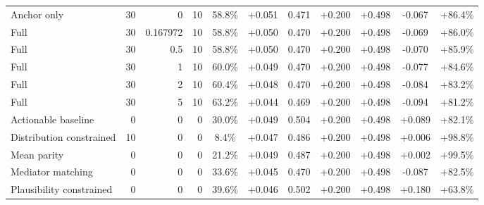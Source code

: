 \begin{table}[htbp]
\begin{tabular}{lrrrccccccc}
Anchor only & 30 & 0 & 10 & 58.8\% & +0.051 & 0.471 & +0.200 & +0.498 & -0.067 & +86.4\% \\
Full & 30 & 0.167972 & 10 & 58.8\% & +0.050 & 0.470 & +0.200 & +0.498 & -0.069 & +86.0\% \\
Full & 30 & 0.5 & 10 & 58.8\% & +0.050 & 0.470 & +0.200 & +0.498 & -0.070 & +85.9\% \\
Full & 30 & 1 & 10 & 60.0\% & +0.049 & 0.470 & +0.200 & +0.498 & -0.077 & +84.6\% \\
Full & 30 & 2 & 10 & 60.4\% & +0.048 & 0.470 & +0.200 & +0.498 & -0.084 & +83.2\% \\
Full & 30 & 5 & 10 & 63.2\% & +0.044 & 0.469 & +0.200 & +0.498 & -0.094 & +81.2\% \\
Actionable baseline & 0 & 0 & 0 & 30.0\% & +0.049 & 0.504 & +0.200 & +0.498 & +0.089 & +82.1\% \\
Distribution constrained & 10 & 0 & 0 & 8.4\% & +0.047 & 0.486 & +0.200 & +0.498 & +0.006 & +98.8\% \\
Mean parity & 0 & 0 & 0 & 21.2\% & +0.049 & 0.487 & +0.200 & +0.498 & +0.002 & +99.5\% \\
Mediator matching & 0 & 0 & 0 & 33.6\% & +0.045 & 0.470 & +0.200 & +0.498 & -0.087 & +82.5\% \\
Plausibility constrained & 0 & 0 & 0 & 39.6\% & +0.046 & 0.502 & +0.200 & +0.498 & +0.180 & +63.8\% \\
\bottomrule
\end{tabular}
\end{table}